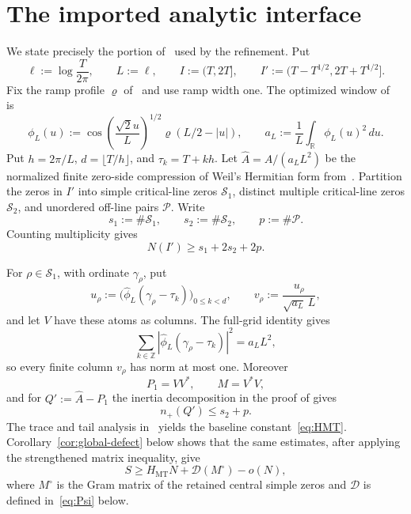 \documentclass[11pt]{article}
\newcommand{\R}{\mathbb R}
\newcommand{\cD}{\mathcal D}
\newcommand{\MT}{\mathrm{MT}}
\begin{document}
\section{The imported analytic interface}\label{sec:interface}

We state precisely the portion of~\cite{Claude26} used by the refinement.
Put
\[
 \ell:=\log\frac{T}{2\pi},\qquad L:=\ell,\qquad
 I:=(T,2T],\qquad I':=(T-T^{1/2},2T+T^{1/2}].
\]
Fix the ramp profile $\varrho$ of~\cite[Section~2.2]{Claude26} and use ramp
width one.  The optimized window of~\cite[Section~7.1]{Claude26} is
\begin{equation}\label{eq:optimized-window}
 \phi_L(u):=\cos\!\left(\frac{\sqrt2u}{L}\right)^{1/2}
 \varrho(L/2-|u|),
 \qquad
 a_L:=\frac1L\int_{\R}\phi_L(u)^2\,du.
\end{equation}
Put $h=2\pi/L$, $d=\lfloor T/h\rfloor$, and $\tau_k=T+kh$.  Let
$\widehat A=A/(a_LL^2)$ be the normalized finite zero-side compression of
Weil's Hermitian form from~\cite[Section~4]{Claude26}.
Partition the zeros in $I'$ into simple critical-line zeros $\mathcal S_1$,
distinct multiple critical-line zeros $\mathcal S_2$, and unordered off-line
pairs $\mathcal P$.  Write
\[
 s_1:=\#\mathcal S_1,\qquad s_2:=\#\mathcal S_2,
 \qquad p:=\#\mathcal P.
\]
Counting multiplicity gives
\begin{equation}\label{eq:Nlower}
 N(I')\ge s_1+2s_2+2p.
\end{equation}

For $\rho\in\mathcal S_1$, with ordinate $\gamma_\rho$, put
\[
 u_\rho:=\bigl(\widehat\phi_L(\gamma_\rho-\tau_k)\bigr)_{0\le k<d},
 \qquad v_\rho:=\frac{u_\rho}{\sqrt{a_L}\,L},
\]
and let $V$ have these atoms as columns.  The full-grid identity
\cite[Lemma~2.2]{Claude26} gives
\[
 \sum_{k\in\mathbb Z}
 |\widehat\phi_L(\gamma_\rho-\tau_k)|^2=a_LL^2,
\]
so every finite column $v_\rho$ has norm at most one.  Moreover
\[
 P_1=VV^*,\qquad M=V^*V,
\]
and for $Q':=\widehat A-P_1$ the inertia decomposition in the proof of
\cite[Proposition~4.4]{Claude26} gives
\begin{equation}\label{eq:positive-index}
 n_+(Q')\le s_2+p.
\end{equation}
The trace and tail analysis in~\cite[Sections~4--7]{Claude26} yields the
baseline constant~\eqref{eq:HMT}.  Corollary~\ref{cor:global-defect} below
shows that the same estimates, after applying the strengthened matrix
inequality, give
\begin{equation}\label{eq:analytic-interface}
 S\ge H_{\MT}N+\cD(M^\circ)-o(N),
\end{equation}
where $M^\circ$ is the Gram matrix of the retained central simple zeros and
$\cD$ is defined in~\eqref{eq:Psi} below.
\end{document}

